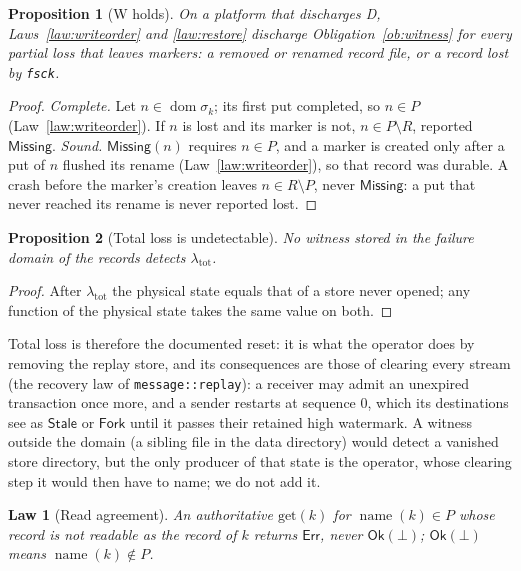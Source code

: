 \documentclass[journal]{IEEEtran}
\newtheorem{law}{Law}
\newtheorem{proposition}{Proposition}
\newcommand{\dom}{\operatorname{dom}}
\newcommand{\name}{\operatorname{name}}
\newcommand{\Ok}{\mathsf{Ok}}
\newcommand{\Err}{\mathsf{Err}}
\newcommand{\Missing}{\mathsf{Missing}}
\begin{document}
\begin{proposition}[W holds]\label{prop:w}
On a platform that discharges D, Laws~\ref{law:writeorder} and \ref{law:restore} discharge
Obligation~\ref{ob:witness} for every partial loss that leaves markers: a removed or renamed
record file, or a record lost by \texttt{fsck}.
\end{proposition}
\begin{proof}
\emph{Complete.}  Let $n\in\dom\sigma_k$; its first $\mathrm{put}$ completed, so
$n\in P$ (Law~\ref{law:writeorder}).  If $n$ is lost and its marker is not, $n\in P\setminus
R$, reported $\Missing$.  \emph{Sound.}  $\Missing(n)$ requires $n\in P$, and a marker
is created only after a put of $n$ flushed its rename (Law~\ref{law:writeorder}), so that
record was durable.  A crash before the marker's creation leaves $n\in R\setminus P$, never
$\Missing$: a put that never reached its rename is never reported lost.
\end{proof}

\begin{proposition}[Total loss is undetectable]\label{prop:total}
No witness stored in the failure domain of the records detects $\lambda_{\mathrm{tot}}$.
\end{proposition}
\begin{proof}
After $\lambda_{\mathrm{tot}}$ the physical state equals that of a store never opened; any
function of the physical state takes the same value on both.
\end{proof}

Total loss is therefore the documented reset: it is what the operator does by removing the
replay store, and its consequences are those of clearing every stream (the recovery law of
\texttt{message::replay}): a receiver may admit an unexpired transaction once more, and a
sender restarts at sequence $0$, which its destinations see as $\mathsf{Stale}$ or
$\mathsf{Fork}$ until it passes their retained high watermark.  A witness outside the domain
(a sibling file in the data directory) would detect a vanished store directory, but the only
producer of that state is the operator, whose clearing step it would then have to name; we
do not add it.

\begin{law}[Read agreement]\label{law:readagree}
An authoritative $\mathrm{get}(k)$ for $\name(k)\in P$ whose record is not readable as the
record of $k$ returns $\Err$, never $\Ok(\bot)$; $\Ok(\bot)$ means $\name(k)\notin P$.
\end{law}
\end{document}
